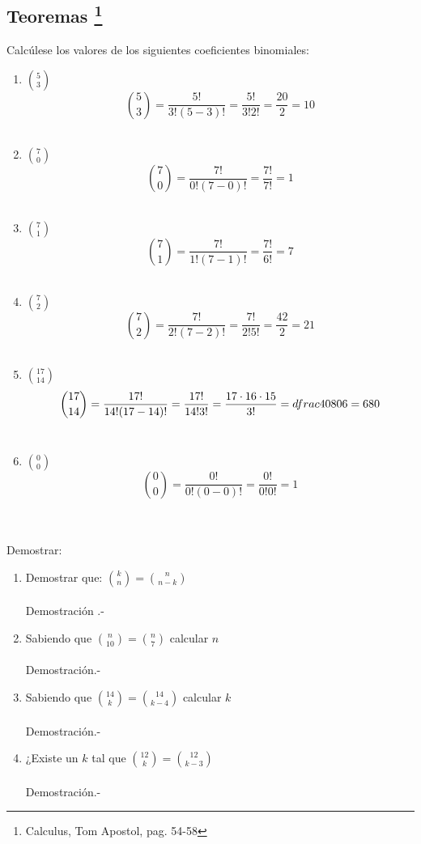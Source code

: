 \subsection[Teoremas]{Teoremas \footnote{Calculus, Tom Apostol, pag. 54-58}}

\begin{ej}
Calcúlese los valores de los siguientes coeficientes binomiales:
\begin{enumerate}[\bfseries a)]
\item ${5 \choose 3}$
$${5 \choose 3} = \dfrac{5!}{3! (5-3)!} = \dfrac{5!}{3! 2!} = \dfrac{20}{2} = 10$$ \\

\item ${7 \choose 0}$
$${7 \choose 0} = \dfrac{7!}{0!(7-0)!} = \dfrac{7!}{7!} = 1$$ \\

\item ${7 \choose 1}$
$${7 \choose 1} = \dfrac{7!}{1!(7-1)!} = \dfrac{7!}{6!} = 7$$ \\

\item ${7 \choose 2}$
$${7 \choose 2} = \dfrac{7!}{2!(7-2)!} = \dfrac{7!}{2!5!} = \dfrac{42}{2} = 21$$ \\

\item ${17 \choose 14}$
$${17 \choose 14} = \dfrac{17!}{14!(17-14)!} = \dfrac{17!}{14!3!} = \dfrac{17 \cdot 16 \cdot 15}{3!} = \\dfrac{4080}{6} = 680$$\\

\item ${0\choose 0}$
$${0\choose 0}=\dfrac{0!}{0!(0-0)!}=\dfrac{0!}{0!0!} = 1$$\\\\
\end{enumerate}
\end{ej}
	
\begin{teo}Demostrar:
\begin{enumerate}[\bfseries a)]
\item Demostrar que: ${k \choose n} = {n \choose n-k}$\\\\
Demostración .- \; 

\item Sabiendo que ${n \choose 10} = {n \choose 7}$ calcular $n$\\\\
Demostración.- \; 

\item Sabiendo que ${14 \choose k} = {14 \choose k-4}$ calcular $k$\\\\
Demostración.- \; 

\item ¿Existe un $k$ tal que ${12 \choose k} = {12 \choose k-3 }$\\\\
Demostración.- \;
\end{enumerate}

\end{teo}



